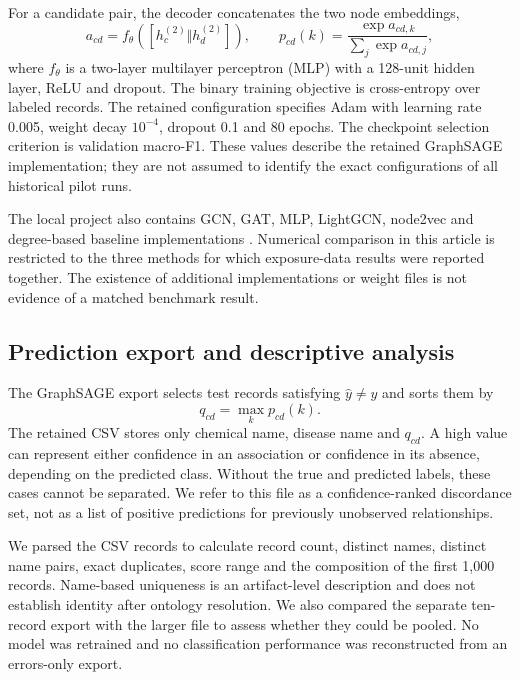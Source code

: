 For a candidate pair, the decoder concatenates the two node embeddings,
\begin{equation}
 a_{cd}=f_{\theta}([h_c^{(2)}\Vert h_d^{(2)}]),\qquad
 p_{cd}(k)=\frac{\exp a_{cd,k}}{\sum_j\exp a_{cd,j}},
\end{equation}
where $f_\theta$ is a two-layer multilayer perceptron (MLP) with a 128-unit hidden layer, ReLU and dropout. The binary training objective is cross-entropy over labeled records. The retained configuration specifies Adam with learning rate 0.005, weight decay $10^{-4}$, dropout 0.1 and 80 epochs. The checkpoint selection criterion is validation macro-F1. These values describe the retained GraphSAGE implementation; they are not assumed to identify the exact configurations of all historical pilot runs.

The local project also contains GCN, GAT, MLP, LightGCN, node2vec and degree-based baseline implementations \citep{lightgcn,node2vec}. Numerical comparison in this article is restricted to the three methods for which exposure-data results were reported together. The existence of additional implementations or weight files is not evidence of a matched benchmark result.

\subsection{Prediction export and descriptive analysis}
The GraphSAGE export selects test records satisfying $\hat y\ne y$ and sorts them by
\begin{equation}
 q_{cd}=\max_k p_{cd}(k).
\end{equation}
The retained CSV stores only chemical name, disease name and $q_{cd}$. A high value can represent either confidence in an association or confidence in its absence, depending on the predicted class. Without the true and predicted labels, these cases cannot be separated. We refer to this file as a confidence-ranked discordance set, not as a list of positive predictions for previously unobserved relationships.

We parsed the CSV records to calculate record count, distinct names, distinct name pairs, exact duplicates, score range and the composition of the first 1,000 records. Name-based uniqueness is an artifact-level description and does not establish identity after ontology resolution. We also compared the separate ten-record export with the larger file to assess whether they could be pooled. No model was retrained and no classification performance was reconstructed from an errors-only export.

